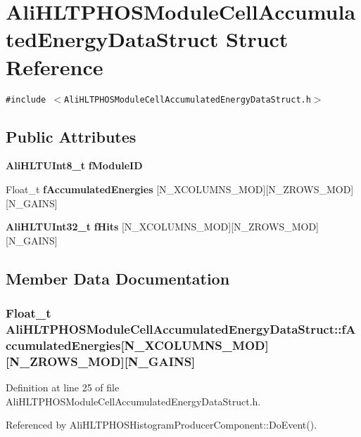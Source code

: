 \section{Ali\-HLTPHOSModule\-Cell\-Accumulated\-Energy\-Data\-Struct Struct Reference}
\label{structAliHLTPHOSModuleCellAccumulatedEnergyDataStruct}
{\tt \#include $<$Ali\-HLTPHOSModule\-Cell\-Accumulated\-Energy\-Data\-Struct.h$>$}

\subsection*{Public Attributes}
\begin{CompactItemize}
\item 
{\bf Ali\-HLTUInt8\_\-t} {\bf f\-Module\-ID}
\item 
Float\_\-t {\bf f\-Accumulated\-Energies} [N\_\-XCOLUMNS\_\-MOD][N\_\-ZROWS\_\-MOD][N\_\-GAINS]
\item 
{\bf Ali\-HLTUInt32\_\-t} {\bf f\-Hits} [N\_\-XCOLUMNS\_\-MOD][N\_\-ZROWS\_\-MOD][N\_\-GAINS]
\end{CompactItemize}


\subsection{Member Data Documentation}
\subsubsection{\setlength{\rightskip}{0pt plus 5cm}Float\_\-t {\bf Ali\-HLTPHOSModule\-Cell\-Accumulated\-Energy\-Data\-Struct::f\-Accumulated\-Energies}[N\_\-XCOLUMNS\_\-MOD][N\_\-ZROWS\_\-MOD][N\_\-GAINS]}\label{structAliHLTPHOSModuleCellAccumulatedEnergyDataStruct_o1}




Definition at line 25 of file Ali\-HLTPHOSModule\-Cell\-Accumulated\-Energy\-Data\-Struct.h.

Referenced by Ali\-HLTPHOSHistogram\-Producer\-Component::Do\-Event().
